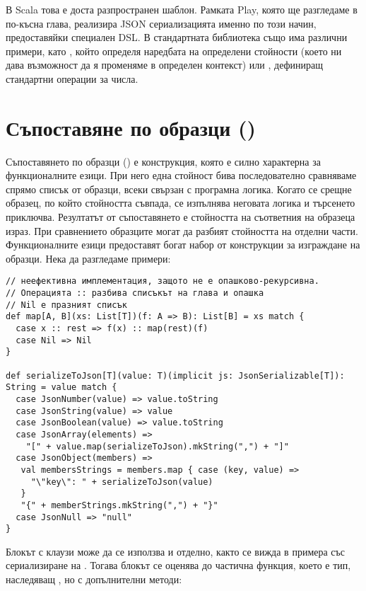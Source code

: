 В Scala това е доста разпространен шаблон. Рамката Play, която ще разгледаме в по-късна глава, реализира JSON сериализацията именно по този начин, предоставяйки специален DSL. В стандартната библиотека също има различни примери, като , който определя наредбата на определени стойности (което ни дава възможност да я променяме в определен контекст) или , дефиниращ стандартни операции за числа.

\section{Съпоставяне по образци ()}

Съпоставянето по образци () е конструкция, която е силно характерна за функционалните езици. При него една стойност бива последователно сравняваме спрямо списък от образци, всеки свързан с програмна логика. Когато се срещне образец, по който стойността съвпада, се изпълнява неговата логика и търсенето приключва. Резултатът от съпоставянето е стойността на съответния на образеца израз. При сравнението образците могат да разбият стойността на отделни части. Функционалните езици предоставят богат набор от конструкции за изграждане на образци. Нека да разгледаме примери:

\begin{lstlisting}[texcl=true]
// неефективна имплементация, защото не е опашково-рекурсивна.
// Операцията :: разбива списъкът на глава и опашка
// Nil е празният списък
def map[A, B](xs: List[T])(f: A => B): List[B] = xs match {
  case x :: rest => f(x) :: map(rest)(f)
  case Nil => Nil
}

def serializeToJson[T](value: T)(implicit js: JsonSerializable[T]): String = value match {
  case JsonNumber(value) => value.toString
  case JsonString(value) => value
  case JsonBoolean(value) => value.toString
  case JsonArray(elements) =>
    "[" + value.map(serializeToJson).mkString(",") + "]"
  case JsonObject(members) =>
   val membersStrings = members.map { case (key, value) =>
     "\"key\": " + serializeToJson(value)
   }
   "{" + memberStrings.mkString(",") + "}"
  case JsonNull => "null"
}
\end{lstlisting}

Блокът с  клаузи може да се използва и отделно, както се вижда в примера със сериализиране на . Тогава блокът се оценява до частична функция, което е тип, наследяващ , но с допълнителни методи:

